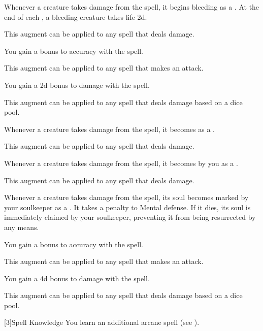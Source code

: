 {            %
             Whenever a creature takes damage from the spell, it begins bleeding as a .
            At the end of each , a bleeding creature takes life  \minus2d.
            \par This augment can be applied to any spell that deals damage.

             You gain a  bonus to accuracy with the spell.
            \par This augment can be applied to any spell that makes an attack.

             You gain a \plus2d bonus to damage with the spell.
            \par This augment can be applied to any spell that deals damage based on a dice pool.

             Whenever a creature takes damage from the spell, it becomes  as a .
            \par This augment can be applied to any spell that deals damage.

             Whenever a creature takes damage from the spell, it becomes  by you as a .
            \par This augment can be applied to any spell that deals damage.

             Whenever a creature takes damage from the spell, its soul becomes marked by your soulkeeper as a .
            It takes a  penalty to Mental defense.
            If it dies, its soul is immediately claimed by your soulkeeper, preventing it from being resurrected by any means.

             You gain a  bonus to accuracy with the spell.
            \par This augment can be applied to any spell that makes an attack.

             You gain a \plus4d bonus to damage with the spell.
            \par This augment can be applied to any spell that deals damage based on a dice pool.
        }

        [3]{Spell Knowledge}
        You learn an additional arcane spell (see ).

